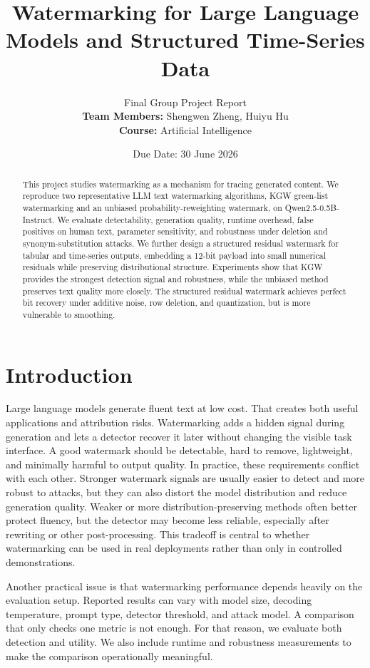 \documentclass[11pt]{article}
\title{\textbf{Watermarking for Large Language Models and Structured Time-Series Data}}
\author{
Final Group Project Report\\[0.5em]
\textbf{Team Members:} Shengwen Zheng, Huiyu Hu\\
\textbf{Course:} Artificial Intelligence
}
\date{Due Date: 30 June 2026}
\begin{document}
\maketitle

\begin{abstract}
This project studies watermarking as a mechanism for tracing generated content.
We reproduce two representative LLM text watermarking algorithms, KGW green-list watermarking and an unbiased probability-reweighting watermark, on Qwen2.5-0.5B-Instruct.
We evaluate detectability, generation quality, runtime overhead, false positives on human text, parameter sensitivity, and robustness under deletion and synonym-substitution attacks.
We further design a structured residual watermark for tabular and time-series outputs, embedding a 12-bit payload into small numerical residuals while preserving distributional structure.
Experiments show that KGW provides the strongest detection signal and robustness, while the unbiased method preserves text quality more closely.
The structured residual watermark achieves perfect bit recovery under additive noise, row deletion, and quantization, but is more vulnerable to smoothing.
\end{abstract}

\section{Introduction}

Large language models generate fluent text at low cost.
That creates both useful applications and attribution risks.
Watermarking adds a hidden signal during generation and lets a detector recover it later without changing the visible task interface.
A good watermark should be detectable, hard to remove, lightweight, and minimally harmful to output quality.
In practice, these requirements conflict with each other.
Stronger watermark signals are usually easier to detect and more robust to attacks, but they can also distort the model distribution and reduce generation quality.
Weaker or more distribution-preserving methods often better protect fluency, but the detector may become less reliable, especially after rewriting or other post-processing.
This tradeoff is central to whether watermarking can be used in real deployments rather than only in controlled demonstrations.

Another practical issue is that watermarking performance depends heavily on the evaluation setup.
Reported results can vary with model size, decoding temperature, prompt type, detector threshold, and attack model.
A comparison that only checks one metric is not enough.
For that reason, we evaluate both detection and utility.
We also include runtime and robustness measurements to make the comparison operationally meaningful.
\end{document}
